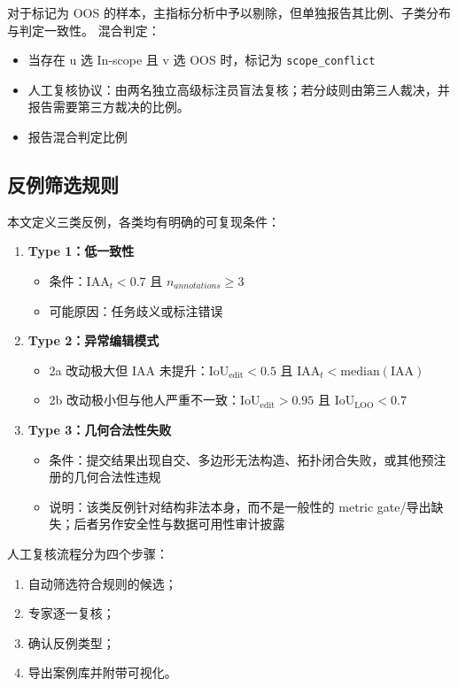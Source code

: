 对于标记为 OOS 的样本，主指标分析中予以剔除，但单独报告其比例、子类分布与判定一致性。
混合判定：
\begin{itemize}
    \item 当存在 u 选 In-scope 且 v 选 OOS 时，标记为 \texttt{scope\_conflict}
    \item 人工复核协议：由两名独立高级标注员盲法复核；若分歧则由第三人裁决，并报告需要第三方裁决的比例。
    \item 报告混合判定比例
\end{itemize}

\subsection{反例筛选规则}\label{sec:method-counterexample}

本文定义三类反例，各类均有明确的可复现条件：
\begin{enumerate}
    \item \textbf{Type 1：低一致性}
    \begin{itemize}
        \item 条件：$\mathrm{IAA}_t<0.7$ 且 $n_{annotations}\geq3$
        \item 可能原因：任务歧义或标注错误
    \end{itemize}
    \item \textbf{Type 2：异常编辑模式}
    \begin{itemize}
        \item 2a 改动极大但 $\mathrm{IAA}$ 未提升：$\mathrm{IoU}_{\mathrm{edit}}<0.5$ 且 $\mathrm{IAA}_t<\mathrm{median}(\mathrm{IAA})$
        \item 2b 改动极小但与他人严重不一致：$\mathrm{IoU}_{\mathrm{edit}}>0.95$ 且 $\mathrm{IoU}_{\mathrm{LOO}}<0.7$
    \end{itemize}
    \item \textbf{Type 3：几何合法性失败}
    \begin{itemize}
        \item 条件：提交结果出现自交、多边形无法构造、拓扑闭合失败，或其他预注册的几何合法性违规
        \item 说明：该类反例针对结构非法本身，而不是一般性的 metric gate/导出缺失；后者另作安全性与数据可用性审计披露
    \end{itemize}
\end{enumerate}
人工复核流程分为四个步骤：
\begin{enumerate}
    \item 自动筛选符合规则的候选；
    \item 专家逐一复核；
    \item 确认反例类型；
    \item 导出案例库并附带可视化。
\end{enumerate}


